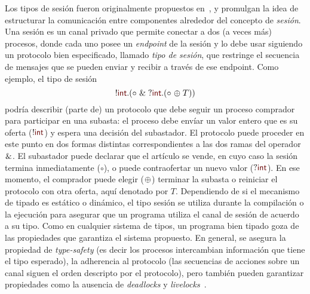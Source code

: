 \documentclass{article}
\newcommand{\mktype}[1]{\mathsf{\color{myred}#1}}
\newcommand{\tint}{\mktype{int}}
\newcommand{\parens}[1]{(#1)}
\newcommand{\tend}{{\circ}}
\newcommand{\cin}[2][.]{{?}#2#1}
\newcommand{\cout}[2][.]{{!}#2#1}
\newcommand{\xpoint}[3]{#1 \mathrel{#2} #3}
\newcommand{\tbranch}[3][p]{\xpoint{#2}{\prescript{}{#1}{\&}}{#3}}
\newcommand{\tchoice}[3][p]{\xpoint{#2}{\prescript{}{#1}{\oplus}}{#3}}
\newcommand{\T}{T}
\begin{document}
Los tipos de sesi\'on fueron originalmente propuestos en~\cite {Honda93}, y promulgan la idea de estructurar 
la comunicaci\'on entre componentes alrededor del concepto de {\em sesi\'on}. Una {sesi\'on}
es un canal privado que permite conectar a dos (a veces m\'as)
procesos, donde cada uno posee un \emph{endpoint} de la sesi\'on y lo debe usar siguiendo 
un protocolo bien  especificado, llamado \emph{tipo de
  sesi\'on}, que restringe el secuencia de mensajes que se pueden
enviar y recibir a trav\'es de ese endpoint. Como ejemplo, el tipo de
sesi\'on
\begin {equation}
  \label {eq:bare.auction}
  \cout \tint \parens {
    \tbranch [] \tend {
      \cin \tint \parens {
        \tchoice [] \tend \T
      }
    }
  }
\end {equation}
podr\'ia describir (parte de) un protocolo que debe seguir un proceso comprador para 
participar en una subasta: el proceso debe env\'iar un valor entero que es su oferta
($ \cout [] \tint $) y espera una decisi\'on del subastador. El
protocolo puede proceder en este punto en dos formas distintas correspondientes a las
dos ramas del operador $ \tbranch [] {} {}$. El subastador puede declarar que el art\'iculo se vende, en cuyo
caso la sesi\'on termina inmediatamente ($ \tend $), o puede contraofertar un nuevo valor ($ \cin [] \tint
$). En ese momento, el comprador puede elegir ($ \tchoice [] {} {} $)
terminar la subasta o reiniciar el protocolo con otra oferta, aqu\'i
denotado por $\T$. Dependiendo de si el mecanismo de tipado es est\'atico o din\'amico, el 
 tipo sesi\'on se utiliza  durante la  compilaci\'on o la ejecuci\'on 
 para asegurar que un programa utiliza el canal de sesi\'on de acuerdo a su tipo. 
Como en cualquier sistema de tipos, un programa bien tipado goza de las propiedades que 
garantiza el sistema propuesto. En general, se asegura la propiedad de  {\em type-safety} 
(es decir los procesos intercambian informaci\'on que tiene el tipo esperado), la adherencia 
al protocolo (las secuencias de acciones sobre un canal siguen el orden descripto por el protocolo), pero tambi\'en pueden garantizar propiedades  como 
la  ausencia de {\em deadlocks} y {\em livelocks}~\cite{HuttelEtAl16}.
\end{document}

